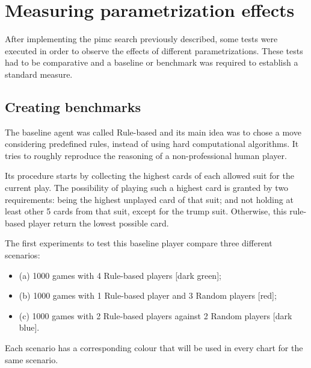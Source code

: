 \section{Measuring parametrization effects}
\label{sec:parametrizing}

After implementing the \ac{pimc} search previously described, some tests were executed in order to observe the effects of different parametrizations.
These tests had to be comparative and a baseline or benchmark was required to establish a standard measure.


\subsection{Creating benchmarks}
The baseline agent was called Rule-based and its main idea was to chose a move considering predefined rules, instead of using hard computational algorithms.
It tries to roughly reproduce the reasoning of a non-professional human player.

Its procedure starts by collecting the highest cards of each allowed suit for the current play.
The possibility of playing such a highest card is granted by two requirements: being the highest unplayed card of that suit; and not holding at least other 5 cards from that suit, except for the trump suit.
Otherwise, this rule-based player return the lowest possible card.

The first experiments to test this baseline player compare three different scenarios:
\begin{itemize}
\item (a) 1000 games with 4 Rule-based players [dark green];
\item (b) 1000 games with 1 Rule-based player and 3 Random players [red];
\item (c) 1000 games with 2 Rule-based players against 2 Random players [dark blue].
\end{itemize}
Each scenario has a corresponding colour that will be used in every chart for the same scenario.

